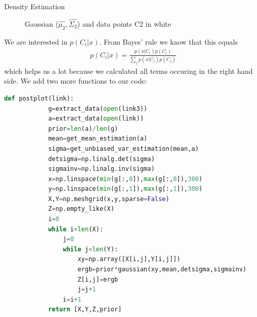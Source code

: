 \documentclass[
ngerman,
]{tudaexercise}
\begin{document}
\begin{task}{Density Estimation}
\begin{subtask}
\begin{figure}[H]
	\caption{Gaussian ($\hat{\mu_2},\hat{\Sigma_2}$) and data points C2 in white}
\end{figure}
\end{subtask}\noindent
\begin{subtask}
	We are interested in $p(C_i|x)$. From Bayes' rule we know that this equals\begin{align*}
		p(C_i|x)=\frac{p(x|C_i)p(C_i)}{\sum_j p(x|C_j)p(C_j)}
	\end{align*}
	which helps us a lot because we calculated all terms occuring in the right hand side. We add two more functions to our code:
	\begin{lstlisting}[language=Python]
		def postplot(link):
			g=extract_data(open(link3))
			a=extract_data(open(link))
			prior=len(a)/len(g)
			mean=get_mean_estimation(a)
			sigma=get_unbiased_var_estimation(mean,a)
			detsigma=np.linalg.det(sigma)
			sigmainv=np.linalg.inv(sigma)
			x=np.linspace(min(g[:,0]),max(g[:,0]),300)
			y=np.linspace(min(g[:,1]),max(g[:,1]),300)
			X,Y=np.meshgrid(x,y,sparse=False)
			Z=np.empty_like(X)
			i=0
			while i<len(X):
				j=0
				while j<len(Y):
					xy=np.array([X[i,j],Y[i,j]])
					ergb=prior*gaussian(xy,mean,detsigma,sigmainv)
					Z[i,j]=ergb
					j=j+1
				i=i+1
			return [X,Y,Z,prior]
		

\end{lstlisting}
\end{subtask}
\end{task}
\end{document}
